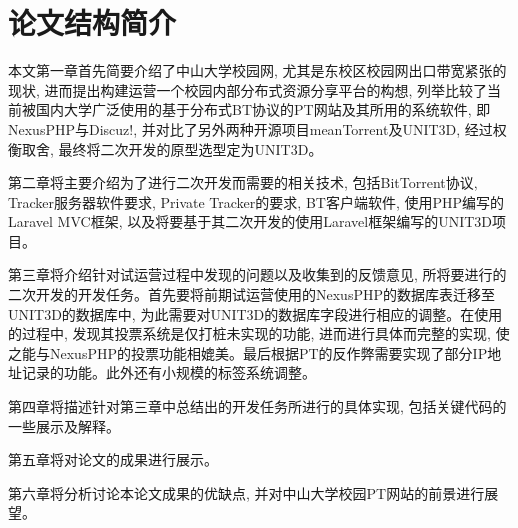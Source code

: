 \section{论文结构简介}

\label{sec:arrangement}
本文第一章首先简要介绍了中山大学校园网, 尤其是东校区校园网出口带宽紧张的现状, 进而提出构建运营一个校园内部分布式资源分享平台的构想, 列举比较了当前被国内大学广泛使用的基于分布式BT协议的PT网站及其所用的系统软件, 即NexusPHP与Discuz!, 并对比了另外两种开源项目meanTorrent及UNIT3D, 经过权衡取舍, 最终将二次开发的原型选型定为UNIT3D。

第二章将主要介绍为了进行二次开发而需要的相关技术, 包括BitTorrent协议, Trac\-ker服务器软件要求, Private Tracker的要求, BT客户端软件, 使用PHP编写的Laravel MVC框架, 以及将要基于其二次开发的使用Laravel框架编写的UNIT3D项目。

第三章将介绍针对试运营过程中发现的问题以及收集到的反馈意见, 所将要进行的二次开发的开发任务。首先要将前期试运营使用的NexusPHP的数据库表迁移至UNIT3D的数据库中, 为此需要对UNIT3D的数据库字段进行相应的调整。在使用的过程中, 发现其投票系统是仅打桩未实现的功能, 进而进行具体而完整的实现, 使之能与NexusPHP的投票功能相媲美。最后根据PT的反作弊需要实现了部分IP地址记录的功能。此外还有小规模的标签系统调整。

第四章将描述针对第三章中总结出的开发任务所进行的具体实现, 包括关键代码的一些展示及解释。

第五章将对论文的成果进行展示。

第六章将分析讨论本论文成果的优缺点, 并对中山大学校园PT网站的前景进行展望。

